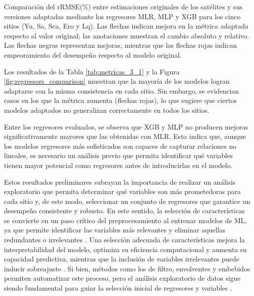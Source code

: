 \documentclass[letterpaper,12pt, twoside]{report}
\providecommand{\DIFdeltex}[1]{{\protect\color{red} \scriptsize #1}} %
\providecommand{\DIFdelFL}[1]{\DIFdel{#1}} %
\providecommand{\DIFdel}[1]{\texorpdfstring{\DIFdeltex{#1}}{}} %
\begin{document}
{%
\DIFdelFL{Comparación del rRMSE(\%) entre estimaciones originales de los satélites y sus versiones adaptadas mediante los regresores MLR, MLP y XGB para los cinco sitios (Yu, Sa, Sca, Ero y Lq). Las flechas indican mejora en la métrica adaptada respecto al valor original; las anotaciones muestran el cambio absoluto y relativo. Las flechas negras representan mejoras, mientras que las flechas rojas indican empeoramiento del desempeño respecto al modelo original.}}

\DIFdel{Los resultados de la Tabla \ref{tab:metricas_3_1} y la Figura \ref{fig:regressors_comparison} muestran que la mayoría de los modelos logran adaptarse con la misma consistencia en cada sitio. Sin embargo, se evidencian casos en los que la métrica aumenta (flechas rojas), lo que sugiere que ciertos modelos adaptados no generalizan correctamente en todos los sitios.
}%

\DIFdel{Entre los regresores evaluados, se observa que XGB y MLP no producen mejoras significativamente mayores que las obtenidas con MLR. Esto indica que, aunque los modelos regresores más sofisticados son capaces de capturar relaciones no lineales, es necesario un análisis previo que permita identificar qué variables tienen mayor potencial como regresores antes de introducirlas en el modelo.
}%

\DIFdel{Estos resultados preliminares subrayan la importancia de realizar un análisis exploratorio que permita determinar qué variables son más prometedoras para cada sitio y, de este modo, seleccionar un conjunto de regresores que garantice un desempeño consistente y robusto. En este sentido, la selección de características se convierte en un paso crítico del preprocesamiento al entrenar modelos de ML, ya que permite identificar las variables más relevantes y eliminar aquellas redundantes o irrelevantes \citep{liu2023, Huang2024}. Una selección adecuada de características mejora la interpretabilidad del modelo, optimiza su eficiencia computacional y aumenta su capacidad predictiva, mientras que la inclusión de variables irrelevantes puede inducir sobreajuste \citep{che2024a}. Si bien, métodos como los de filtro, envolventes y embebidos permiten automatizar este proceso, pero el análisis exploratorio de datos sigue siendo fundamental para guiar la selección inicial de regresores y variables \citep{Cheng2024}.
}%
\end{document}
